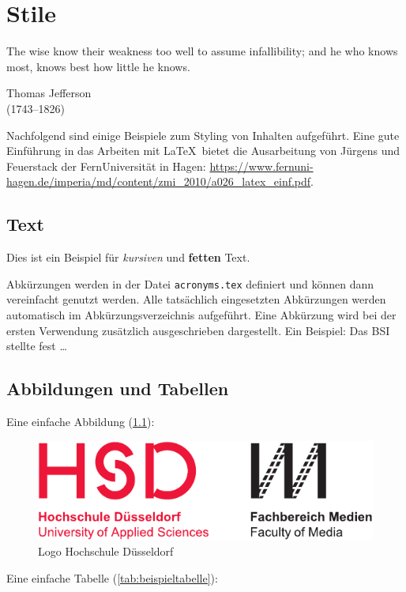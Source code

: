 \chapter{Stile}

\epigraph{\glqq The wise know their weakness too well to assume infallibility; and he who knows most, knows best how little he knows.\grqq\bigskip}%
{{Thomas Jefferson}\\ (1743--1826)}

\noindent
Nachfolgend sind einige Beispiele zum Styling von Inhalten aufgeführt.
Eine gute Einführung in das Arbeiten mit \LaTeX\ bietet die Ausarbeitung von Jürgens und Feuerstack der FernUniversität in Hagen: \url{https://www.fernuni-hagen.de/imperia/md/content/zmi_2010/a026_latex_einf.pdf}.

\indent

\section{Text}

Dies ist ein Beispiel für \textit{kursiven} und \textbf{fetten} Text.

\bigskip

Abkürzungen werden in der Datei \texttt{acronyms.tex} definiert und können dann vereinfacht genutzt werden. Alle tatsächlich eingesetzten Abkürzungen werden automatisch im Abkürzungsverzeichnis aufgeführt. Eine Abkürzung wird bei der ersten Verwendung zusätzlich ausgeschrieben dargestellt. Ein Beispiel: Das \ac{BSI} stellte fest \dots

\section{Abbildungen und Tabellen}

Eine einfache Abbildung (\ref{fig:hsd_logo}):

\begin{figure}[hbtp]
  \centering
  \includegraphics[width=.6\textwidth]{figures/hsd_m_logo.pdf}
  \caption{Logo Hochschule Düsseldorf}
  \label{fig:hsd_logo}
\end{figure}

\bigskip

Eine einfache Tabelle (\ref{tab:beispieltabelle}):

